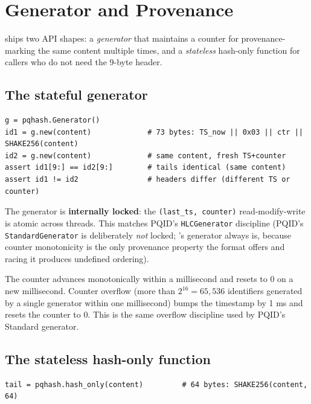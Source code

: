 \section{Generator and Provenance}
\label{sec:generator}

\pqhash{} ships two API shapes: a \emph{generator} that maintains a counter for provenance-marking the same content multiple times, and a \emph{stateless} hash-only function for callers who do not need the 9-byte header.

\subsection{The stateful generator}

\begin{lstlisting}[language=Pseudocode]
g = pqhash.Generator()
id1 = g.new(content)             # 73 bytes: TS_now || 0x03 || ctr || SHAKE256(content)
id2 = g.new(content)             # same content, fresh TS+counter
assert id1[9:] == id2[9:]        # tails identical (same content)
assert id1 != id2                # headers differ (different TS or counter)
\end{lstlisting}

The generator is \textbf{internally locked}: the \texttt{(last\_ts, counter)} read-modify-write is atomic across threads. This matches PQID's \texttt{HLCGenerator} discipline (PQID's \texttt{StandardGenerator} is deliberately \emph{not} locked; \pqhash{}'s generator always is, because counter monotonicity is the only provenance property the format offers and racing it produces undefined ordering).

The counter advances monotonically within a millisecond and resets to 0 on a new millisecond. Counter overflow (more than $2^{16} = 65{,}536$ identifiers generated by a single generator within one millisecond) bumps the timestamp by 1 ms and resets the counter to 0. This is the same overflow discipline used by PQID's Standard generator.

\subsection{The stateless hash-only function}

\begin{lstlisting}[language=Pseudocode]
tail = pqhash.hash_only(content)         # 64 bytes: SHAKE256(content, 64)
\end{lstlisting}

